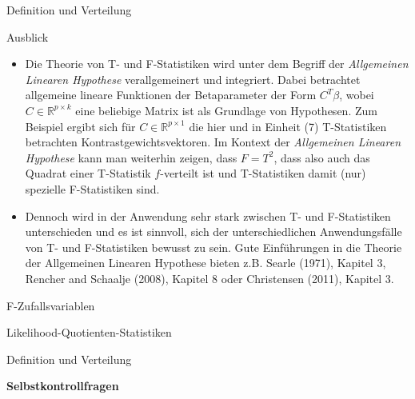 \documentclass[
  8pt,
  ignorenonframetext,
]{beamer}
\begin{document}
\begin{frame}{Definition und Verteilung}
\protect\hypertarget{definition-und-verteilung-8}{}
\small

Ausblick

\begin{itemize}
\item
  \justifying Die Theorie von T- und F-Statistiken wird unter dem
  Begriff der \emph{Allgemeinen Linearen Hypothese} verallgemeinert und
  integriert. Dabei betrachtet allgemeine lineare Funktionen der
  Betaparameter der Form \(C^T\beta\), wobei
  \(C \in \mathbb{R}^{p \times k}\) eine beliebige Matrix ist als
  Grundlage von Hypothesen. Zum Beispiel ergibt sich für
  \(C \in \mathbb{R}^{p \times 1}\) die hier und in Einheit (7)
  T-Statistiken betrachten Kontrastgewichtsvektoren. Im Kontext der
  \emph{Allgemeinen Linearen Hypothese} kann man weiterhin zeigen, dass
  \(F = T^2\), dass also auch das Quadrat einer T-Statistik
  \(f\)-verteilt ist und T-Statistiken damit (nur) spezielle
  F-Statistiken sind. \vspace{2mm}
\item
  \justifying Dennoch wird in der Anwendung sehr stark zwischen T- und
  F-Statistiken unterschieden und es ist sinnvoll, sich der
  unterschiedlichen Anwendungsfälle von T- und F-Statistiken bewusst zu
  sein. Gute Einführungen in die Theorie der Allgemeinen Linearen
  Hypothese bieten z.B. Searle (1971), Kapitel 3, Rencher and Schaalje
  (2008), Kapitel 8 oder Christensen (2011), Kapitel 3.
\end{itemize}
\end{frame}

\begin{frame}{}
\protect\hypertarget{section-12}{}
\vfill
\large
{}

F-Zufallsvariablen

Likelihood-Quotienten-Statistiken

Definition und Verteilung

\textbf{Selbstkontrollfragen} \vfill
\end{frame}
\end{document}
